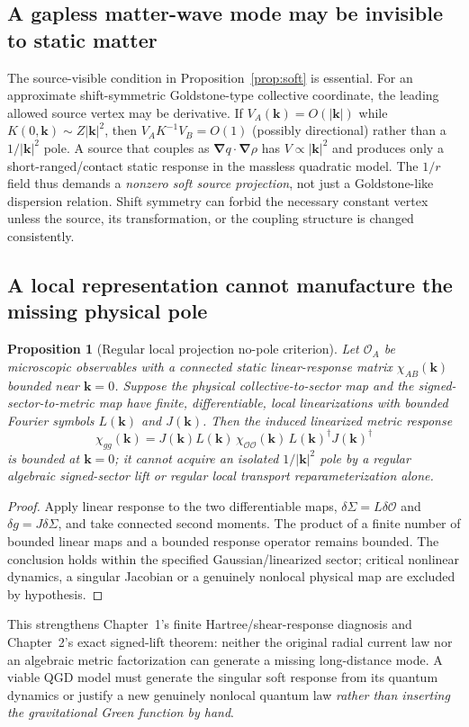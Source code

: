 \documentclass[11pt,a4paper]{article}
\newtheorem{proposition}[theorem]{Proposition}
\theoremstyle{remark}\newtheorem{remark}[theorem]{Remark}
\begin{document}
\subsection{A gapless matter-wave mode may be invisible to static matter}
The source-visible condition in Proposition~\ref{prop:soft} is essential. For an approximate shift-symmetric Goldstone-type collective coordinate, the leading allowed source vertex may be derivative. If $V_A(\bm k)=O(|\bm k|)$ while $K(0,\bm k)\sim Z|\bm k|^2$, then $V_AK^{-1}V_B=O(1)$ (possibly directional) rather than a $1/|\bm k|^2$ pole. A source that couples as $\bm\nabla q\cdot\bm\nabla\rho$ has $V\propto|\bm k|^2$ and produces only a short-ranged/contact static response in the massless quadratic model. The $1/r$ field thus demands a \emph{nonzero soft source projection}, not just a Goldstone-like dispersion relation. Shift symmetry can forbid the necessary constant vertex unless the source, its transformation, or the coupling structure is changed consistently.

\subsection{A local representation cannot manufacture the missing physical pole}
\begin{proposition}[Regular local projection no-pole criterion]\label{prop:v22-nopole}
Let $\mathcal O_A$ be microscopic observables with a connected static linear-response matrix $\chi_{AB}(\bm k)$ bounded near $\bm k=0$. Suppose the physical collective-to-sector map and the signed-sector-to-metric map have finite, differentiable, \emph{local} linearizations with bounded Fourier symbols $L(\bm k)$ and $J(\bm k)$. Then the induced linearized metric response
\begin{equation}\label{eq:v22-pullback}
 \chi_{gg}(\bm k)=J(\bm k)L(\bm k)\,\chi_{\mathcal O\mathcal O}(\bm k)\,L(\bm k)^\dagger J(\bm k)^\dagger
\end{equation}
is bounded at $\bm k=0$; it cannot acquire an isolated $1/|\bm k|^2$ pole by a regular algebraic signed-sector lift or regular local transport reparameterization alone.
\end{proposition}
\begin{proof}
Apply linear response to the two differentiable maps, $\delta\Sigma=L\delta\mathcal O$ and $\delta g=J\delta\Sigma$, and take connected second moments. The product of a finite number of bounded linear maps and a bounded response operator remains bounded. The conclusion holds within the specified Gaussian/linearized sector; critical nonlinear dynamics, a singular Jacobian or a genuinely nonlocal physical map are excluded by hypothesis.
\end{proof}
This strengthens Chapter~1's finite Hartree/shear-response diagnosis and Chapter~2's exact signed-lift theorem: neither the original radial current law nor an algebraic metric factorization can generate a missing long-distance mode. A viable QGD model must generate the singular soft response from its quantum dynamics or justify a new genuinely nonlocal quantum law \emph{rather than inserting the gravitational Green function by hand}.
\end{document}
